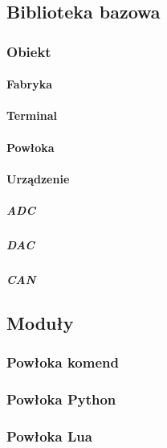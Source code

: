 \documentclass[
12pt, %
a4paper
]{report}
\begin{document}
            \subsection{Biblioteka bazowa}
            
                \subsubsection{Obiekt}
                
                    \paragraph{Fabryka}
                    
                    \paragraph{Terminal}
                    
                    \paragraph{Powłoka}
                    
                    \paragraph{Urządzenie}
                    
                        \subparagraph{ADC}
                        
                        \subparagraph{DAC}
                        
                        \subparagraph{CAN}
                        
            \subsection{Moduły}
            
                \subsubsection{Powłoka komend}
                
                \subsubsection{Powłoka Python}
                
                \subsubsection{Powłoka Lua}
                
\end{document}
